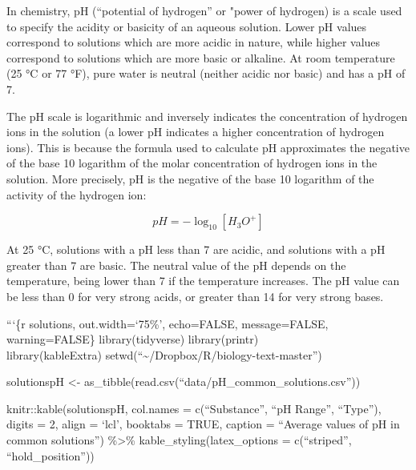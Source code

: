 \documentclass[
]{article}
\begin{document}
In chemistry, pH (``potential of hydrogen'' or "power of hydrogen) is a
scale used to specify the acidity or basicity of an aqueous solution.
Lower pH values correspond to solutions which are more acidic in nature,
while higher values correspond to solutions which are more basic or
alkaline. At room temperature (25 °C or 77 °F), pure water is neutral
(neither acidic nor basic) and has a pH of 7.

The pH scale is logarithmic and inversely indicates the concentration of
hydrogen ions in the solution (a lower pH indicates a higher
concentration of hydrogen ions). This is because the formula used to
calculate pH approximates the negative of the base 10 logarithm of the
molar concentration of hydrogen ions in the solution. More precisely, pH
is the negative of the base 10 logarithm of the activity of the hydrogen
ion:

\[pH = - \log_{10} [H_3O^+]\]

At 25 °C, solutions with a pH less than 7 are acidic, and solutions with
a pH greater than 7 are basic. The neutral value of the pH depends on
the temperature, being lower than 7 if the temperature increases. The pH
value can be less than 0 for very strong acids, or greater than 14 for
very strong bases.

```\{r solutions, out.width=`75\%', echo=FALSE, message=FALSE,
warning=FALSE\} library(tidyverse) library(printr)\\
library(kableExtra)
setwd(``\textasciitilde/Dropbox/R/biology-text-master'')

solutionspH \textless-
as\_tibble(read.csv(``data/pH\_common\_solutions.csv''))

knitr::kable(solutionspH, col.names = c(``Substance'', ``pH Range'',
``Type''), digits = 2, align = `lcl', booktabs = TRUE, caption =
``Average values of pH in common solutions'') \%\textgreater\%
kable\_styling(latex\_options = c(``striped'', ``hold\_position''))
\end{document}
